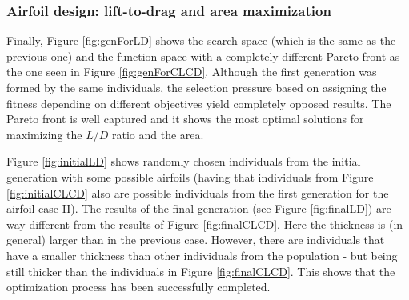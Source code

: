 \subsubsection*{Airfoil design: lift-to-drag and area maximization}

Finally, Figure \ref{fig:genForLD} shows the search space (which is the same as the previous one) and the function space with a completely different Pareto front as the one seen in Figure \ref{fig:genForCLCD}. Although the first generation was formed by the same individuals, the selection pressure based on assigning the fitness depending on different objectives yield completely opposed results. The Pareto front is well captured and it shows the most optimal solutions for maximizing the $L/D$ ratio and the area. 

Figure \ref{fig:initialLD} shows randomly chosen individuals from the initial generation with some possible airfoils (having that individuals from Figure \ref{fig:initialCLCD} also are possible individuals from the first generation for the airfoil case II). The results of the final generation (see Figure \ref{fig:finalLD}) are way different from the results of Figure \ref{fig:finalCLCD}. Here the thickness is (in general) larger than in the previous case. However, there are individuals that have a smaller thickness than other individuals from the population - but being still thicker than the individuals in Figure \ref{fig:finalCLCD}. This shows that the optimization process has been successfully completed. 